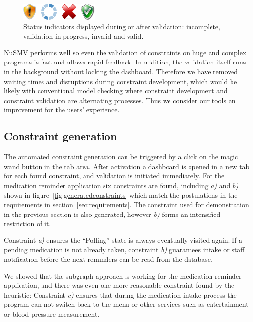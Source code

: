 \documentclass[conference]{IEEEtran}
\begin{document}
\begin{figure}[htbp]
  \centering
  \includegraphics[scale=0.5]{results}
  \caption{Status indicators displayed during or after validation: incomplete, validation in progress, invalid and valid.}
  \label{fig:results}
\end{figure}

NuSMV performs well so even the validation of constraints on huge and complex programs is fast and allows rapid feedback. In addition, the validation itself runs in the background without locking the dashboard. Therefore we have removed waiting times and disruptions during constraint development, which would be likely with conventional model checking where constraint development and constraint validation are alternating processes. Thus we consider our tools an improvement for the users' experience.


\subsection{Constraint generation}
\label{sec:prototypeandevaluation_constraintgeneration}

The automated constraint generation can be triggered by a click on the magic wand button in the tab area. After activation a dashboard is opened in a new tab for each found constraint, and validation is initiated immediately. For the medication reminder application six constraints are found, including \emph{a)} and \emph{b)} shown in figure~\ref{fig:generatedconstraints} which match the postulations in the requirements in section~\ref{sec:requirements}.
The constraint used for demonstration in the previous section is also generated, however \emph{b)} forms an intensified restriction of it.

Constraint \emph{a)} ensures the ``Polling'' state is always eventually visited again. If a pending medication is not already taken, constraint \emph{b)} guarantees intake or staff notification before the next reminders can be read from the database.

We showed that the subgraph approach is working for the medication reminder application, and there was even one more reasonable constraint found by the heuristic: Constraint \emph{c)} ensures that during the medication intake process the program can not switch back to the menu or other services such as entertainment or blood pressure measurement.
\end{document}
